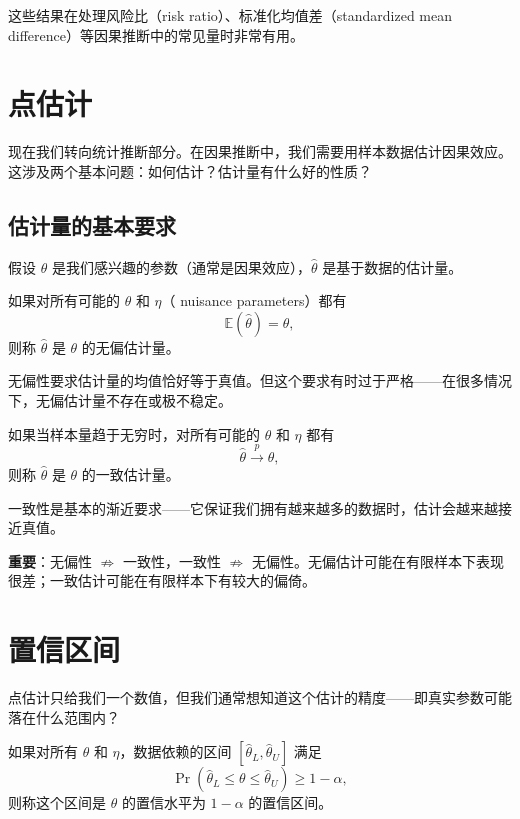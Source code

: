 这些结果在处理风险比（risk ratio）、标准化均值差（standardized mean difference）等因果推断中的常见量时非常有用。

\section{点估计}\label{sec:point-estimation}

现在我们转向统计推断部分。在因果推断中，我们需要用样本数据估计因果效应。这涉及两个基本问题：如何估计？估计量有什么好的性质？

\subsection{估计量的基本要求}

假设 $\theta$ 是我们感兴趣的参数（通常是因果效应），$\hat{\theta}$ 是基于数据的估计量。

\begin{Definition}[无偏性]\label{def:unbiasedness}
如果对所有可能的 $\theta$ 和 $\eta$（ nuisance parameters）都有
\[
\mathbb{E}(\hat{\theta}) = \theta,
\]
则称 $\hat{\theta}$ 是 $\theta$ 的无偏估计量。
\end{Definition}

无偏性要求估计量的均值恰好等于真值。但这个要求有时过于严格——在很多情况下，无偏估计量不存在或极不稳定。

\begin{Definition}[一致性]\label{def:consistency}
如果当样本量趋于无穷时，对所有可能的 $\theta$ 和 $\eta$ 都有
\[
\hat{\theta} \xrightarrow{p} \theta,
\]
则称 $\hat{\theta}$ 是 $\theta$ 的一致估计量。
\end{Definition}

一致性是基本的渐近要求——它保证我们拥有越来越多的数据时，估计会越来越接近真值。

\textbf{重要}：无偏性 $\not\Rightarrow$ 一致性，一致性 $\not\Rightarrow$ 无偏性。无偏估计可能在有限样本下表现很差；一致估计可能在有限样本下有较大的偏倚。

\section{置信区间}\label{sec:confidence-interval}

点估计只给我们一个数值，但我们通常想知道这个估计的精度——即真实参数可能落在什么范围内？

\begin{Definition}[置信区间]\label{def:confidence-interval}
如果对所有 $\theta$ 和 $\eta$，数据依赖的区间 $[\hat{\theta}_L, \hat{\theta}_U]$ 满足
\[
\Pr(\hat{\theta}_L \leq \theta \leq \hat{\theta}_U) \geq 1 - \alpha,
\]
则称这个区间是 $\theta$ 的置信水平为 $1-\alpha$ 的置信区间。
\end{Definition}

